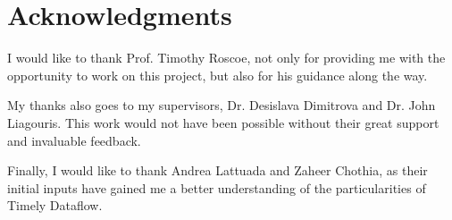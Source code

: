 
\begingroup
\chapter*{Acknowledgments}

I would like to thank Prof. Timothy Roscoe, not only for providing me with the
opportunity to work on this project, but also for his guidance along the way.

My thanks also goes to my supervisors, Dr. Desislava Dimitrova and Dr. John Liagouris.
This work would not have been possible without their great support and invaluable feedback.

Finally, I would like to thank Andrea Lattuada and Zaheer Chothia, as their
initial inputs have gained me a better understanding of the particularities
of Timely Dataflow.

\endgroup
